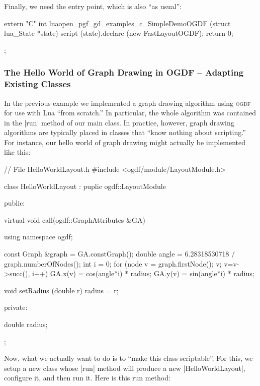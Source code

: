 Finally, we need the entry point, which is also ``as usual'':

\begin{codeexample}
extern "C" int luaopen_pgf_gd_examples_c_SimpleDemoOGDF (struct lua_State *state) {
  script (state).declare (new FastLayoutOGDF);
  return 0;
}
\end{codeexample}


\begin{codeexample}[]
\tikz {};
\end{codeexample}



\subsubsection{The Hello World of Graph Drawing in OGDF -- Adapting Existing Classes}

In the previous example we implemented a graph drawing algorithm using
\textsc{ogdf} for use with Lua ``from scratch.'' In particular, the
whole algorithm was contained in the |run| method of our main
class. In practice, however, graph drawing algorithms are typically
placed in classes that ``know nothing about scripting.'' For instance,
our hello world of graph drawing might actually be implemented like this:

\begin{codeexample}
// File HelloWorldLayout.h
#include <ogdf/module/LayoutModule.h>

class HelloWorldLayout : puplic ogdf::LayoutModule {
public:
  
  virtual void call(ogdf::GraphAttributes &GA)
  {
    using namespace ogdf;
    
    const Graph &graph = GA.constGraph();
    double angle  = 6.28318530718 / graph.numberOfNodes();
    int i = 0;
    for (node v = graph.firstNode(); v; v=v->succ(), i++) {
      GA.x(v) = cos(angle*i) * radius;
      GA.y(v) = sin(angle*i) * radius;
    }
  }
  
  void setRadius (double r) { radius = r; }
  
private:

  double radius;
};
\end{codeexample}

Now, what we actually want to do is to ``make this class
scriptable''. For this, we setup a new class whose |run| method will
produce a new |HelloWorldLayout|, configure it, and then run it. Here
is this run method:


